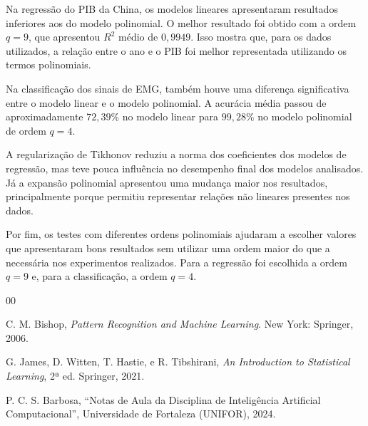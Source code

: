 \documentclass[conference]{IEEEtran}
\begin{document}
Na regressão do PIB da China, os modelos lineares apresentaram resultados inferiores aos do modelo polinomial. O melhor resultado foi obtido com a ordem $q=9$, que apresentou $R^2$ médio de $0,9949$. Isso mostra que, para os dados utilizados, a relação entre o ano e o PIB foi melhor representada utilizando os termos polinomiais.

Na classificação dos sinais de EMG, também houve uma diferença significativa entre o modelo linear e o modelo polinomial. A acurácia média passou de aproximadamente $72,39\%$ no modelo linear para $99,28\%$ no modelo polinomial de ordem $q=4$.

A regularização de Tikhonov reduziu a norma dos coeficientes dos modelos de regressão, mas teve pouca influência no desempenho final dos modelos analisados. Já a expansão polinomial apresentou uma mudança maior nos resultados, principalmente porque permitiu representar relações não lineares presentes nos dados.

Por fim, os testes com diferentes ordens polinomiais ajudaram a escolher valores que apresentaram bons resultados sem utilizar uma ordem maior do que a necessária nos experimentos realizados. Para a regressão foi escolhida a ordem $q=9$ e, para a classificação, a ordem $q=4$.

\begin{thebibliography}{00}

C. M. Bishop, \textit{Pattern Recognition and Machine Learning}. New York: Springer, 2006.

G. James, D. Witten, T. Hastie, e R. Tibshirani,
\textit{An Introduction to Statistical Learning}, 2ª ed. Springer, 2021.

P. C. S. Barbosa,
``Notas de Aula da Disciplina de Inteligência Artificial Computacional'',
Universidade de Fortaleza (UNIFOR), 2024.

\end{thebibliography}
\end{document}
